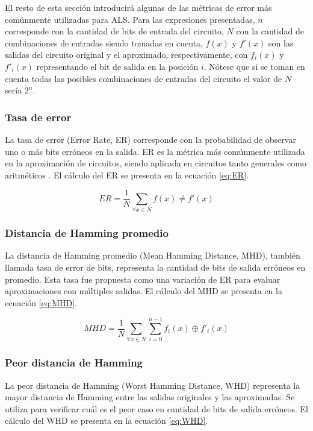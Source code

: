 El resto de esta sección introducirá algunas de las métricas de error más
comúnmente utilizadas para ALS. Para las expresiones presentadas, $n$
corresponde con la cantidad de bits de entrada del circuito, $N$ con la
cantidad de combinaciones de entradas siendo tomadas en cuenta, $f(x)$ y
$f'(x)$ son las salidas del circuito original y el aproximado, respectivamente,
con $f_i(x)$ y $f'_i(x)$ representando el bit de salida en la posición $i$.
Nótese que si se toman en cuenta todas las posibles combinaciones de entradas
del circuito el valor de $N$ sería $2^n$.

\subsubsection{Tasa de error}

La tasa de error (Error Rate, ER) corresponde con la probabilidad de observar
uno o más bits erróneos en la salida. ER es la métrica más comúnmente utilizada
en la aproximación de circuitos, siendo aplicada en circuitos tanto generales
como aritméticos \cite{ammes_two-level_2022}. El cálculo del ER se presenta en
la ecuación \ref{eq:ER}.

\begin{equation} \label{eq:ER}
  ER = \frac{1}{N} \sum_{\forall x \in N} f(x) \neq f'(x)
\end{equation}

\subsubsection{Distancia de Hamming promedio}

La distancia de Hamming promedio (Mean Hamming Distance, MHD), también llamada
tasa de error de bits, representa la cantidad de bits de salida erróneos en
promedio. Esta tasa fue propuesta como una variación de ER para evaluar
aproximaciones con múltiples salidas. El cálculo del MHD se presenta en la
ecuación \ref{eq:MHD}.

\begin{equation} \label{eq:MHD}
  MHD = \frac{1}{N} \sum_{\forall x \in N} \sum_{i=0}^{n-1} f_i(x) \oplus f'_i(x)
\end{equation}

\subsubsection{Peor distancia de Hamming}

La peor distancia de Hamming (Worst Hamming Distance, WHD) representa la mayor
distancia de Hamming entre las salidas originales y las aproximadas. Se utiliza
para verificar cuál es el peor caso en cantidad de bits de salida erróneos. El
cálculo del WHD se presenta en la ecuación \ref{eq:WHD}.

